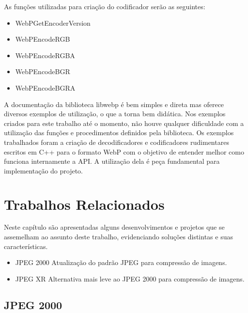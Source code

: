 \documentclass[espaco=simples,appendix=Name]{abnt}
\begin{document}
As funções utilizadas para criação do codificador serão as seguintes:

\begin{itemize}
	\item WebPGetEncoderVersion
	\item WebPEncodeRGB
	\item WebPEncodeRGBA
	\item WebPEncodeBGR
	\item WebPEncodeBGRA
\end{itemize}

A documentação da biblioteca libwebp é bem simples e direta mas oferece diversos exemplos de utilização, o que a torna bem didática. Nos exemplos criados para este trabalho até o momento, não houve qualquer dificuldade com a utilização das funções e procedimentos definidos pela biblioteca. Os exemplos trabalhados foram a criação de decodificadores e codificadores rudimentares escritos em C++ para o formato WebP com o objetivo de entender melhor como funciona internamente a API. A utilização dela é peça fundamental para implementação do projeto.



\chapter{Trabalhos Relacionados}

Neste capítulo são apresentadas alguns desenvolvimentos e projetos que se assemelham ao assunto deste trabalho, evidenciando soluções distintas e suas características.

\begin{itemize}
	\item JPEG 2000 Atualização do padrão JPEG para compressão de imagens.
	\item JPEG XR Alternativa mais leve ao JPEG 2000 para compressão de imagens.
\end{itemize}


\section{JPEG 2000}
\end{document}
